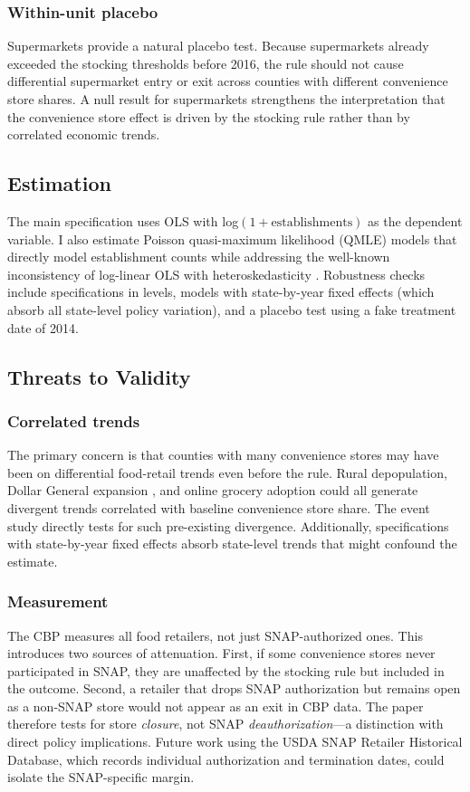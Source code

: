 \documentclass[12pt]{article}
\begin{document}
\subsubsection*{Within-unit placebo} Supermarkets provide a natural placebo test. Because supermarkets already exceeded the stocking thresholds before 2016, the rule should not cause differential supermarket entry or exit across counties with different convenience store shares. A null result for supermarkets strengthens the interpretation that the convenience store effect is driven by the stocking rule rather than by correlated economic trends.

\subsection{Estimation}

The main specification uses OLS with log$(1 + \text{establishments})$ as the dependent variable. I also estimate Poisson quasi-maximum likelihood (QMLE) models that directly model establishment counts while addressing the well-known inconsistency of log-linear OLS with heteroskedasticity \citep{santos2006log}. Robustness checks include specifications in levels, models with state-by-year fixed effects (which absorb all state-level policy variation), and a placebo test using a fake treatment date of 2014.

\subsection{Threats to Validity}

\subsubsection*{Correlated trends} The primary concern is that counties with many convenience stores may have been on differential food-retail trends even before the rule. Rural depopulation, Dollar General expansion \citep{chen2016effect}, and online grocery adoption could all generate divergent trends correlated with baseline convenience store share. The event study directly tests for such pre-existing divergence. Additionally, specifications with state-by-year fixed effects absorb state-level trends that might confound the estimate.

\subsubsection*{Measurement} The CBP measures all food retailers, not just SNAP-authorized ones. This introduces two sources of attenuation. First, if some convenience stores never participated in SNAP, they are unaffected by the stocking rule but included in the outcome. Second, a retailer that drops SNAP authorization but remains open as a non-SNAP store would not appear as an exit in CBP data. The paper therefore tests for store \textit{closure}, not SNAP \textit{deauthorization}---a distinction with direct policy implications. Future work using the USDA SNAP Retailer Historical Database, which records individual authorization and termination dates, could isolate the SNAP-specific margin.
\end{document}
